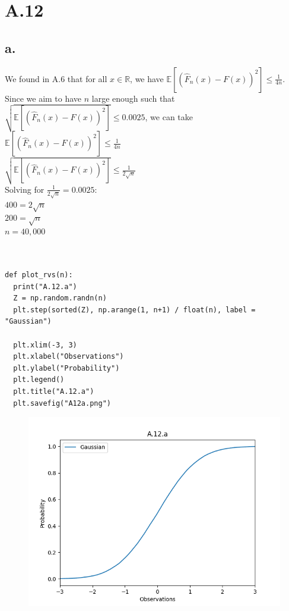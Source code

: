 \documentclass{article}
\newcommand{\field}[1]{\mathbb{#1}}
\newcommand{\1}{\mathbf{1}}
\newcommand{\E}{\mathbb{E}}
\newcommand{\R}{\field{R}} %
\begin{document}
\section*{A.12}
{\Large 

\subsection*{a.}
We found in A.6 that for all $x \in \R$, we have  $\displaystyle \E[ ( \widehat{F}_n(x) - F(x) )^2 ] \leq \tfrac{1}{4n}$. Since we aim to have $n$ large enough such that $ \sqrt{\E[(\widehat{F}_n(x)-F(x))^2 ]} \leq 0.0025$, we can take \\
$\E[ ( \widehat{F}_n(x) - F(x) )^2 ] \leq \tfrac{1}{4n}$ \\
$\sqrt{\E[ ( \widehat{F}_n(x) - F(x) )^2 ]} \leq \tfrac{1}{2\sqrt{n}}$ \\
Solving for $\frac{1}{2\sqrt{n}} = 0.0025$: \\
$400 = 2\sqrt{n}$ \\
$200 = \sqrt{n}$ \\
$n = 40,000$ \\ \\ \\

\begin{verbatim}
def plot_rvs(n):
  print("A.12.a")
  Z = np.random.randn(n)
  plt.step(sorted(Z), np.arange(1, n+1) / float(n), label = "Gaussian")

  plt.xlim(-3, 3)
  plt.xlabel("Observations")
  plt.ylabel("Probability")
  plt.legend()
  plt.title("A.12.a")
  plt.savefig("A12a.png")
\end{verbatim}

\begin{figure}[ht!]
  \centering
  \includegraphics[width=130mm]{A12a.PNG}
\end{figure}

}
\end{document}
